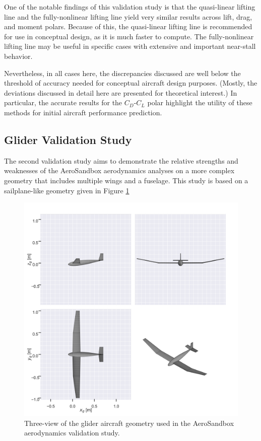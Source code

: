 One of the notable findings of this validation study is that the quasi-linear lifting line and the fully-nonlinear lifting line yield very similar results across lift, drag, and moment polars. Because of this, the quasi-linear lifting line is recommended for use in conceptual design, as it is much faster to compute. The fully-nonlinear lifting line may be useful in specific cases with extensive and important near-stall behavior.

Nevertheless, in all cases here, the discrepancies discussed are well below the threshold of accuracy needed for conceptual aircraft design purposes. (Mostly, the deviations discussed in detail here are presented for theoretical interest.) In particular, the accurate results for the $C_D$-$C_L$ polar highlight the utility of these methods for initial aircraft performance prediction.

\subsection{Glider Validation Study}

The second validation study aims to demonstrate the relative strengths and weaknesses of the AeroSandbox aerodynamics analyses on a more complex geometry that includes multiple wings and a fuselage. This study is based on a sailplane-like geometry given in Figure \ref{fig:glider_geometry}

\begin{figure}[!htb]
    \centering
    \includegraphics[width=5in]{../figures/aero_validation/glider_geometry.png}
    \caption{Three-view of the glider aircraft geometry used in the AeroSandbox aerodynamics validation study.}
    \label{fig:glider_geometry}
\end{figure}

